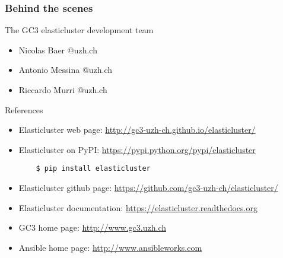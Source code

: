 \documentclass[english,serif,mathserif,usenames,dvipsnames]{beamer}
\begin{document}
\begin{frame}
  \frametitle{Behind the scenes}
  \begin{block}{The GC3 elasticluster development team}
  \begin{itemize}
    \item Nicolas Baer {@uzh.ch}
    \item Antonio Messina {@uzh.ch}
    \item Riccardo Murri {@uzh.ch}
  \end{itemize}
  \end{block}
\end{frame}

\begin{frame}[fragile]
  {References}
  \begin{itemize}
  \item Elasticluster web page: 
    \url{http://gc3-uzh-ch.github.io/elasticluster/}

    \item Elasticluster on PyPI:
      \url{https://pypi.python.org/pypi/elasticluster}
      
\begin{verbatim}
    $ pip install elasticluster
\end{verbatim}

\item Elasticluster github page: 
  \url{https://github.com/gc3-uzh-ch/elasticluster/}
\item Elasticluster documentation:
    \url{https://elasticluster.readthedocs.org}
  \item GC3 home page: \url{http://www.gc3.uzh.ch}
  \item Ansible home page: \url{http://www.ansibleworks.com}
  \end{itemize}
\end{frame}

    
\end{document}

